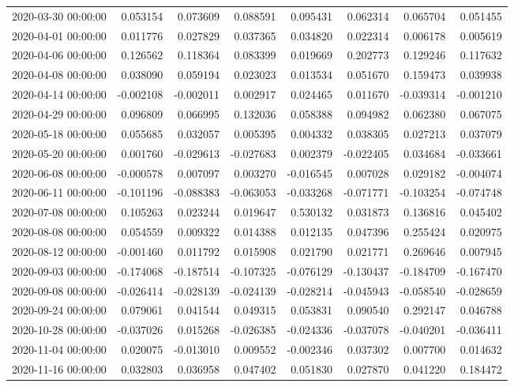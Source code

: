 \begin{tabular}{lrrrrrrr}
2020-03-30 00:00:00 & 0.053154 & 0.073609 & 0.088591 & 0.095431 & 0.062314 & 0.065704 & 0.051455 \\
2020-04-01 00:00:00 & 0.011776 & 0.027829 & 0.037365 & 0.034820 & 0.022314 & 0.006178 & 0.005619 \\
2020-04-06 00:00:00 & 0.126562 & 0.118364 & 0.083399 & 0.019669 & 0.202773 & 0.129246 & 0.117632 \\
2020-04-08 00:00:00 & 0.038090 & 0.059194 & 0.023023 & 0.013534 & 0.051670 & 0.159473 & 0.039938 \\
2020-04-14 00:00:00 & -0.002108 & -0.002011 & 0.002917 & 0.024465 & 0.011670 & -0.039314 & -0.001210 \\
2020-04-29 00:00:00 & 0.096809 & 0.066995 & 0.132036 & 0.058388 & 0.094982 & 0.062380 & 0.067075 \\
2020-05-18 00:00:00 & 0.055685 & 0.032057 & 0.005395 & 0.004332 & 0.038305 & 0.027213 & 0.037079 \\
2020-05-20 00:00:00 & 0.001760 & -0.029613 & -0.027683 & 0.002379 & -0.022405 & 0.034684 & -0.033661 \\
2020-06-08 00:00:00 & -0.000578 & 0.007097 & 0.003270 & -0.016545 & 0.007028 & 0.029182 & -0.004074 \\
2020-06-11 00:00:00 & -0.101196 & -0.088383 & -0.063053 & -0.033268 & -0.071771 & -0.103254 & -0.074748 \\
2020-07-08 00:00:00 & 0.105263 & 0.023244 & 0.019647 & 0.530132 & 0.031873 & 0.136816 & 0.045402 \\
2020-08-08 00:00:00 & 0.054559 & 0.009322 & 0.014388 & 0.012135 & 0.047396 & 0.255424 & 0.020975 \\
2020-08-12 00:00:00 & -0.001460 & 0.011792 & 0.015908 & 0.021790 & 0.021771 & 0.269646 & 0.007945 \\
2020-09-03 00:00:00 & -0.174068 & -0.187514 & -0.107325 & -0.076129 & -0.130437 & -0.184709 & -0.167470 \\
2020-09-08 00:00:00 & -0.026414 & -0.028139 & -0.024139 & -0.028214 & -0.045943 & -0.058540 & -0.028659 \\
2020-09-24 00:00:00 & 0.079061 & 0.041544 & 0.049315 & 0.053831 & 0.090540 & 0.292147 & 0.046788 \\
2020-10-28 00:00:00 & -0.037026 & 0.015268 & -0.026385 & -0.024336 & -0.037078 & -0.040201 & -0.036411 \\
2020-11-04 00:00:00 & 0.020075 & -0.013010 & 0.009552 & -0.002346 & 0.037302 & 0.007700 & 0.014632 \\
2020-11-16 00:00:00 & 0.032803 & 0.036958 & 0.047402 & 0.051830 & 0.027870 & 0.041220 & 0.184472 \\

\end{tabular}
